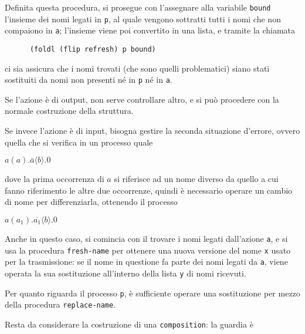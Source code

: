 Definita questa procedura, si prosegue con l'assegnare alla variabile
\lstinline{bound} l'insieme dei nomi legati in \lstinline{p}, al quale
vengono sottratti tutti i nomi che non compaiono in \lstinline{a};
l'insieme viene poi convertito in una lista, e tramite la chiamata

\begin{lstlisting}
      (foldl (flip refresh) p bound)
\end{lstlisting}

ci sia assicura che i nomi trovati (che sono quelli problematici) siano
stati sostituiti da nomi non presenti n\'e in \lstinline{p} n\'e in
\lstinline{a}.

Se l'azione \`e di output, non serve controllare altro, e si pu\`o
procedere con la normale costruzione della struttura.

Se invece l'azione \`e di input, bisogna gestire la seconda situazione
d'errore, ovvero quella che si verifica in un processo quale

\begin{pilisting}
$
    a(a).\overline{a}\langle b\rangle.0
$
\end{pilisting}

dove la prima occorrenza di $a$ si riferisce ad un nome diverso da
quello a cui fanno riferimento le altre due occorrenze, quindi \`e
necessario operare un cambio di nome per differenziarla, ottenendo il
processo

\begin{pilisting}
$
    a(a_1).\overline{a_1}\langle b\rangle.0
$
\end{pilisting}

Anche in questo caso, si comincia con il trovare i nomi legati dall'azione
\lstinline{a}, e si usa la procedura \lstinline{fresh-name} per ottenere
una nuova versione del nome \lstinline{x} usato per la trasmissione: se il
nome in questione fa parte dei nomi legati da \lstinline{a}, viene
operata la sua sostituzione all'interno della lista \lstinline{y} di nomi
ricevuti.

Per quanto riguarda il processo \lstinline{p}, \`e sufficiente operare una
sostituzione per mezzo della procedura \lstinline{replace-name}.

Resta da considerare la costruzione di una \lstinline{composition}: la
guardia \`e

